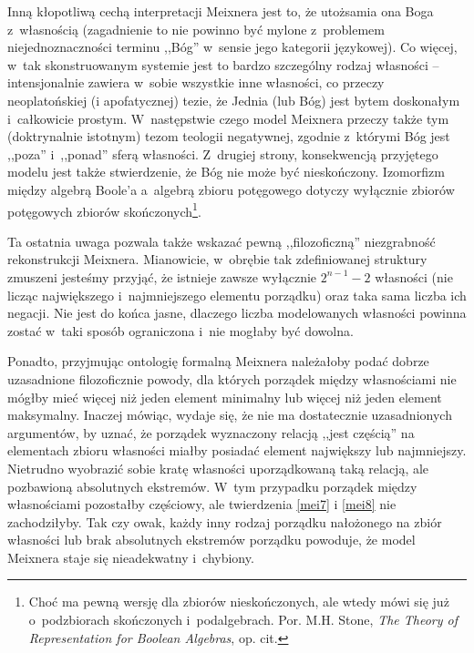 Inną kłopotliwą cechą interpretacji Meixnera jest to, że utożsamia ona Boga z~własnością (zagadnienie to nie powinno być mylone z~problemem niejednoznaczności terminu ,,Bóg'' w~sensie jego kategorii językowej). Co więcej, w~tak skonstruowanym systemie jest to bardzo szczególny rodzaj własności -- intensjonalnie zawiera w~sobie wszystkie inne własności, co przeczy neoplatońskiej (i apofatycznej) tezie, że Jednia (lub Bóg) jest bytem doskonałym i~całkowicie prostym. W~następstwie czego model Meixnera przeczy także tym (doktrynalnie istotnym) tezom teologii negatywnej, zgodnie z~którymi Bóg jest ,,poza'' i~,,ponad'' sferą własności. Z~drugiej strony, konsekwencją przyjętego modelu jest także stwierdzenie, że Bóg nie może być nieskończony. Izomorfizm między algebrą Boole'a a~algebrą zbioru potęgowego dotyczy wyłącznie zbiorów potęgowych zbiorów skończonych\footnote{Choć ma pewną wersję dla zbiorów nieskończonych, ale wtedy mówi się już o~podzbiorach skończonych i~podalgebrach. Por. M.H. Stone, \textit{The Theory of Representation for Boolean Algebras}, op. cit.}.

Ta ostatnia uwaga pozwala także wskazać pewną ,,filozoficzną'' niezgrabność rekonstrukcji Meixnera. Mianowicie, w~obrębie tak zdefiniowanej struktury zmuszeni jesteśmy przyjąć, że istnieje zawsze wyłącznie $2^{n-1}-2$ własności (nie licząc największego i~najmniejszego elementu porządku) oraz taka sama liczba ich negacji. Nie jest do końca jasne, dlaczego liczba modelowanych własności powinna zostać w~taki sposób ograniczona i~nie mogłaby być dowolna.

Ponadto, przyjmując ontologię formalną Meixnera należałoby podać dobrze uzasadnione filozoficznie powody, dla których porządek między własnościami nie mógłby mieć więcej niż jeden element minimalny lub więcej niż jeden element maksymalny. Inaczej mówiąc, wydaje się, że nie ma dostatecznie uzasadnionych argumentów, by uznać, że porządek wyznaczony relacją ,,jest częścią'' na elementach zbioru własności miałby posiadać element największy lub najmniejszy. Nietrudno wyobrazić sobie kratę własności uporządkowaną taką relacją, ale pozbawioną absolutnych ekstremów. W~tym przypadku porządek między własnościami pozostałby częściowy, ale twierdzenia \eqref{mei7} i \eqref{mei8} nie zachodziłyby. Tak czy owak, każdy inny rodzaj porządku nałożonego na zbiór własności lub brak absolutnych ekstremów porządku powoduje, że model Meixnera staje się nieadekwatny i~chybiony.

